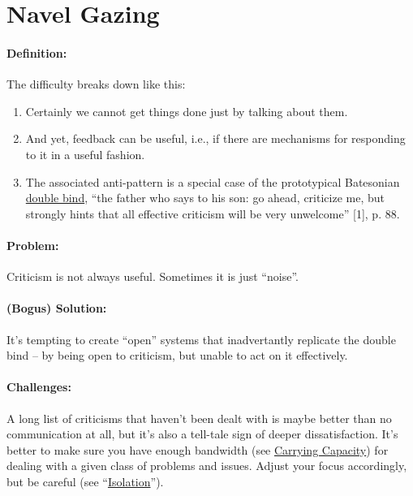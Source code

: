 \section{Navel Gazing}
\paragraph{Definition:} The difficulty breaks down like this:

\begin{enumerate}
\item
  Certainly we cannot get things done just by talking about them.
\item
  And yet, feedback can be useful, i.e., if there are mechanisms for
  responding to it in a useful fashion.
\item
  The associated anti-pattern is a special case of the prototypical
  Batesonian \href{http://en.wikipedia.org/wiki/Double_bind}{double
  bind}, ``the father who says to his son: go ahead, criticize me, but
  strongly hints that all effective criticism will be very unwelcome''
  {[}1{]}, p. 88.
\end{enumerate}

\paragraph{Problem:} Criticism is not always useful. Sometimes it is just
``noise''.

\paragraph{(Bogus) Solution:} It's tempting to create ``open'' systems that
inadvertantly replicate the double bind -- by being open to criticism,
but unable to act on it effectively.

\paragraph{Challenges:} A long list of criticisms that haven't been dealt
with is maybe better than no communication at all, but it's also a
tell-tale sign of deeper dissatisfaction. It's better to make sure you
have enough bandwidth (see
\href{http://peeragogy.org/patterns-usecases/patterns-and-heuristics/carrying-capacity/}{Carrying
Capacity}) for dealing with a given class of problems and issues. Adjust
your focus accordingly, but be careful (see
``\href{http://peeragogy.org/antipatterns/isolation/}{Isolation}'').


